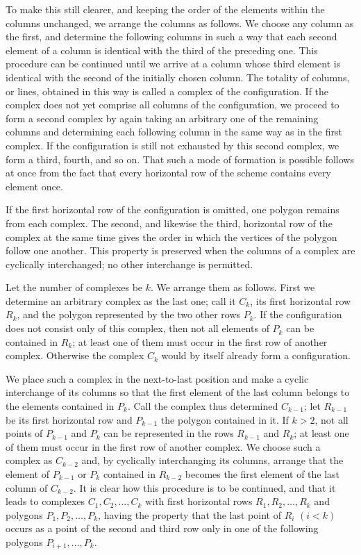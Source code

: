 \documentclass[11pt]{article}
\begin{document}
To make this still clearer, and keeping the order of the elements within the columns unchanged, we arrange the columns as follows. We choose any column as the first, and determine the following columns in such a way that each second element of a column is identical with the third of the preceding one. This procedure can be continued until we arrive at a column whose third element is identical with the second of the initially chosen column. The totality of columns, or lines, obtained in this way is called a complex of the configuration. If the complex does not yet comprise all columns of the configuration, we proceed to form a second complex by again taking an arbitrary one of the remaining columns and determining each following column in the same way as in the first complex. If the configuration is still not exhausted by this second complex, we form a third, fourth, and so on. That such a mode of formation is possible follows at once from the fact that every horizontal row of the scheme contains every element once.

If the first horizontal row of the configuration is omitted, one polygon remains from each complex. The second, and likewise the third, horizontal row of the complex at the same time gives the order in which the vertices of the polygon follow one another. This property is preserved when the columns of a complex are cyclically interchanged; no other interchange is permitted.

Let the number of complexes be $k$. We arrange them as follows. First we determine an arbitrary complex as the last one; call it $C_k$, its first horizontal row $R_k$, and the polygon represented by the two other rows $P_k$. If the configuration does not consist only of this complex, then not all elements of $P_k$ can be contained in $R_k$; at least one of them must occur in the first row of another complex. Otherwise the complex $C_k$ would by itself already form a configuration.

We place such a complex in the next-to-last position and make a cyclic interchange of its columns so that the first element of the last column belongs to the elements contained in $P_k$. Call the complex thus determined $C_{k-1}$; let $R_{k-1}$ be its first horizontal row and $P_{k-1}$ the polygon contained in it. If $k>2$, not all points of $P_{k-1}$ and $P_k$ can be represented in the rows $R_{k-1}$ and $R_k$; at least one of them must occur in the first row of another complex. We choose such a complex as $C_{k-2}$ and, by cyclically interchanging its columns, arrange that the element of $P_{k-1}$ or $P_k$ contained in $R_{k-2}$ becomes the first element of the last column of $C_{k-2}$. It is clear how this procedure is to be continued, and that it leads to complexes $C_1,C_2,\ldots,C_k$ with first horizontal rows $R_1,R_2,\ldots,R_k$ and polygons $P_1,P_2,\ldots,P_k$, having the property that the last point of $R_i$ $(i<k)$ occurs as a point of the second and third row only in one of the following polygons $P_{i+1},\ldots,P_k$.
\end{document}
